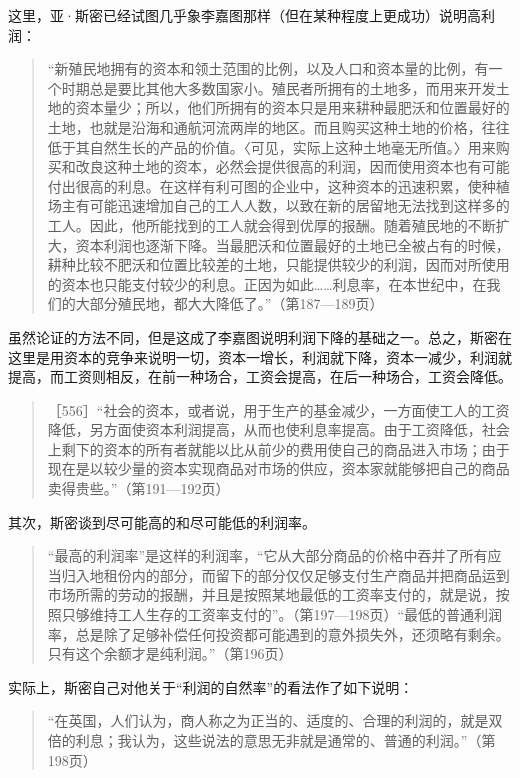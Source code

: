 这里，亚·斯密已经试图几乎象李嘉图那样（但在某种程度上更成功）说明高利润：

\begin{quote}{“新殖民地拥有的资本和领土范围的比例，以及人口和资本量的比例，有一个时期总是要比其他大多数国家小。殖民者所拥有的土地多，而用来开发土地的资本量少；所以，他们所拥有的资本只是用来耕种最肥沃和位置最好的土地，也就是沿海和通航河流两岸的地区。而且购买这种土地的价格，往往低于其自然生长的产品的价值。〈可见，实际上这种土地毫无所值。〉用来购买和改良这种土地的资本，必然会提供很高的利润，因而使用资本也有可能付出很高的利息。在这样有利可图的企业中，这种资本的迅速积累，使种植场主有可能迅速增加自己的工人人数，以致在新的居留地无法找到这样多的工人。因此，他所能找到的工人就会得到优厚的报酬。随着殖民地的不断扩大，资本利润也逐渐下降。当最肥沃和位置最好的土地已全被占有的时候，耕种比较不肥沃和位置比较差的土地，只能提供较少的利润，因而对所使用的资本也只能支付较少的利息。正因为如此……利息率，在本世纪中，在我们的大部分殖民地，都大大降低了。”（第187—189页）}\end{quote}

虽然论证的方法不同，但是这成了李嘉图说明利润下降的基础之一。总之，斯密在这里是用资本的竞争来说明一切，资本一增长，利润就下降，资本一减少，利润就提高，而工资则相反，在前一种场合，工资会提高，在后一种场合，工资会降低。

\begin{quote}{［556］“社会的资本，或者说，用于生产的基金减少，一方面使工人的工资降低，另方面使资本利润提高，从而也使利息率提高。由于工资降低，社会上剩下的资本的所有者就能以比从前少的费用使自己的商品进入市场；由于现在是以较少量的资本实现商品对市场的供应，资本家就能够把自己的商品卖得贵些。”（第191—192页）}\end{quote}

其次，斯密谈到尽可能高的和尽可能低的利润率。

\begin{quote}{“最高的利润率”是这样的利润率，“它从大部分商品的价格中吞并了所有应当归入地租份内的部分，而留下的部分仅仅足够支付生产商品并把商品运到市场所需的劳动的报酬，并且是按照某地最低的工资率支付的，就是说，按照只够维持工人生存的工资率支付的”。（第197—198页）“最低的普通利润率，总是除了足够补偿任何投资都可能遇到的意外损失外，还须略有剩余。只有这个余额才是纯利润。”（第196页）}\end{quote}

实际上，斯密自己对他关于“利润的自然率”的看法作了如下说明：

\begin{quote}{“在英国，人们认为，商人称之为正当的、适度的、合理的利润的，就是双倍的利息；我认为，这些说法的意思无非就是通常的、普通的利润。”（第198页）}\end{quote}

